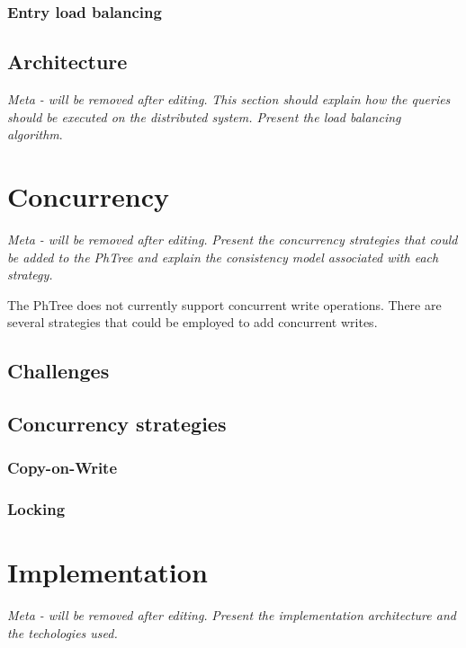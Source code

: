 \documentclass[11pt,a4paper]{globis-book}
\begin{document}
\subsection{Entry load balancing}

\section{Architecture}
\label{sec:distindex-architectures}

\textit{Meta - will be removed after editing.}
\textit{This section should explain how the queries should be executed on the distributed system. Present the load balancing algorithm}.

\chapter{Concurrency}
\label{ch:concurrency}

\textit{Meta - will be removed after editing.}
\textit{Present the concurrency strategies that could be added to the PhTree and explain the consistency model associated with each strategy.}

The PhTree does not currently support concurrent write operations. There are several strategies that could be employed to add concurrent writes.

\section{Challenges}

\section{Concurrency strategies}

\subsection{Copy-on-Write}

\subsection{Locking}

\chapter{Implementation}
\label{ch:implementation}

\textit{Meta - will be removed after editing.}
\textit{Present the implementation architecture and the techologies used.}
\end{document}
